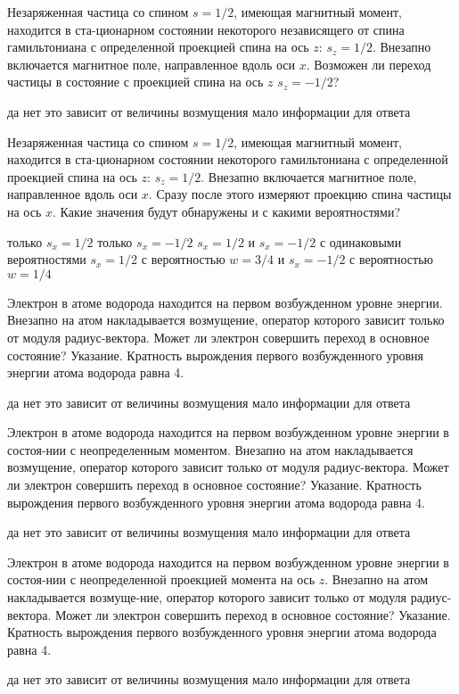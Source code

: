 \documentclass[11pt,a4paper]{exam}
\begin{document}
\begin{questions}
\question  Незаряженная частица со спином $s = 1/2$, имеющая магнитный момент, находится в ста-ционарном состоянии некоторого независящего от спина гамильтониана с определенной проекцией спина на ось $z$: ${s_z} = 1/2$. Внезапно включается магнитное поле, направленное вдоль оси $x$. Возможен ли переход частицы в состояние с проекцией спина на ось $z$ ${s_z} =  - 1/2$?
\begin{choices}
\choice да
\choice нет
\choice это зависит от величины возмущения
\choice мало информации для ответа
\end{choices}

\question  Незаряженная частица со спином $s = 1/2$, имеющая магнитный момент, находится в ста-ционарном состоянии некоторого гамильтониана с определенной проекцией спина на ось $z$: ${s_z} = 1/2$. Внезапно включается магнитное поле, направленное вдоль оси $x$. Сразу после этого измеряют проекцию спина частицы на ось $x$. Какие значения будут обнаружены и с какими вероятностями?
\begin{choices}
\choice только ${s_x} = 1/2$
\choice только ${s_x} =  - 1/2$
\choice ${s_x} = 1/2$ и ${s_x} =  - 1/2$ с одинаковыми вероятностями
\choice ${s_x} = 1/2$ с вероятностью $w = 3/4$ и ${s_x} =  - 1/2$ с вероятностью $w = 1/4$
\end{choices}

\question Электрон в атоме водорода находится на первом возбужденном уровне энергии. Внезапно на атом накладывается возмущение, оператор которого зависит только от модуля радиус-вектора. Может ли электрон совершить переход в основное состояние? Указание. Кратность вырождения первого возбужденного уровня энергии атома водорода равна 4.
\begin{choices}
\choice да
\choice нет
\choice это зависит от величины возмущения
\choice мало информации для ответа
\end{choices}

\question Электрон в атоме водорода находится на первом возбужденном уровне энергии в состоя-нии с неопределенным моментом. Внезапно на атом накладывается возмущение, оператор которого зависит только от модуля радиус-вектора. Может ли электрон совершить переход в основное состояние? Указание. Кратность вырождения первого возбужденного уровня энергии атома водорода равна 4.
\begin{choices}
\choice да
\choice нет
\choice это зависит от величины возмущения
\choice мало информации для ответа
\end{choices}

\question Электрон в атоме водорода находится на первом возбужденном уровне энергии в состоя-нии с неопределенной проекцией момента на ось $z$. Внезапно на атом накладывается возмуще-ние, оператор которого зависит только от модуля радиус-вектора. Может ли электрон совершить переход в основное состояние? Указание. Кратность вырождения первого возбужденного уровня энергии атома водорода равна 4.
\begin{choices}
\choice да
\choice нет
\choice это зависит от величины возмущения
\choice мало информации для ответа
\end{choices}


\end{questions}
\end{document}
